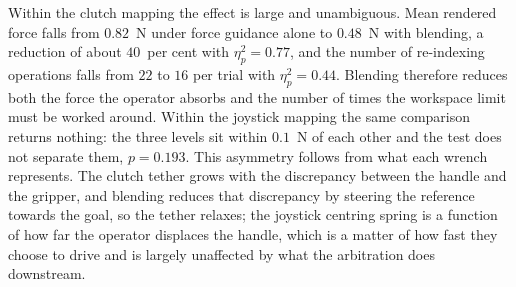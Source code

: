 \documentclass[12pt,a4paper,twoside,openright]{report}
\begin{document}
Within the clutch mapping the effect is large and unambiguous. Mean rendered force falls from $0.82$~N under force guidance alone to $0.48$~N with blending, a reduction of about $40$~per cent with $\eta^2_p = 0.77$, and the number of re-indexing operations falls from $22$ to $16$ per trial with $\eta^2_p = 0.44$. Blending therefore reduces both the force the operator absorbs and the number of times the workspace limit must be worked around. Within the joystick mapping the same comparison returns nothing: the three levels sit within $0.1$~N of each other and the test does not separate them, $p = 0.193$. This asymmetry follows from what each wrench represents. The clutch tether grows with the discrepancy between the handle and the gripper, and blending reduces that discrepancy by steering the reference towards the goal, so the tether relaxes; the joystick centring spring is a function of how far the operator displaces the handle, which is a matter of how fast they choose to drive and is largely unaffected by what the arbitration does downstream.
\end{document}
